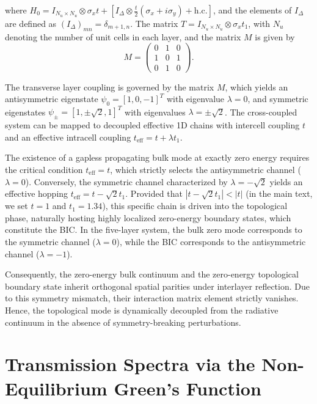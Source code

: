 \documentclass[twocolumn,english,prl,epsfig,rotate,showpacs,aps, superscriptaddress]{revtex4-2}
\begin{document}
{{where $H_0 = I_{N_u \times N_u} \otimes \sigma_x t + \left[ I_\Delta \otimes \frac{t}{2} (\sigma_x + i \sigma_y) + \text{h.c.} \right]$, and the elements of $I_\Delta$ are defined as $(I_\Delta)_{mn} = \delta_{m+1,n}$. The matrix $T = I_{N_u \times N_u} \otimes \sigma_x t_1$, with $N_u$ denoting the number of unit cells in each layer, and the matrix $M$ is given by
\begin{equation}
M =
\begin{pmatrix}
0 & 1      & 0        \\
1 & 0      & 1      \\

0 & 1      &  0
\end{pmatrix}.
\end{equation}

The transverse layer coupling is governed by the matrix $M$, which yields an antisymmetric eigenstate $\psi_{0} = [1, 0, -1]^T$ with eigenvalue $\lambda=0$, and symmetric eigenstates $\psi_{\pm} = [1, \pm\sqrt{2}, 1]^T$ with eigenvalues $\lambda=\pm\sqrt{2}$. The cross-coupled system can be mapped to decoupled effective 1D chains with intercell coupling $t$ and an effective intracell coupling $t_{\mathrm{eff}} = t + \lambda t_1$.

The existence of a gapless propagating bulk mode at exactly zero energy requires the critical condition $t_{\mathrm{eff}} = t$, which strictly selects the antisymmetric channel ($\lambda=0$). Conversely, the symmetric channel characterized by $\lambda=-\sqrt{2}$ yields an effective hopping $t_{\mathrm{eff}} = t - \sqrt{2}t_1$. Provided that $|t - \sqrt{2}t_1| < |t|$ (in the main text, we set $t=1$ and $t_1=1.34$), this specific chain is driven into the topological phase, naturally hosting highly localized zero-energy boundary states, which constitute the BIC. In the five-layer system, the bulk zero mode corresponds to the symmetric channel ($\lambda=0$), while the BIC corresponds to the antisymmetric channel ($\lambda=-1$).

Consequently, the zero-energy bulk continuum and the zero-energy topological boundary state inherit orthogonal spatial parities under interlayer reflection. Due to this symmetry mismatch, their interaction matrix element strictly vanishes. Hence, the topological mode is dynamically decoupled from the radiative continuum in the absence of symmetry-breaking perturbations.

\label{app3}

\section{Transmission Spectra via the Non-Equilibrium Green's Function}

}}
\end{document}
